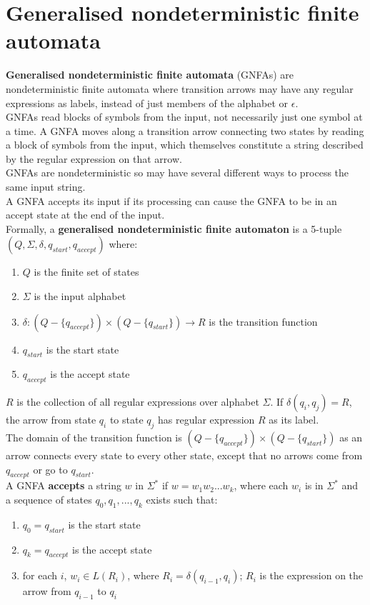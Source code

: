 \documentclass{article}
\begin{document}
\section{Generalised nondeterministic finite automata}
\textbf{Generalised nondeterministic finite automata} (GNFAs) are nondeterministic finite automata where transition arrows may have any regular expressions as labels, instead of just members of the alphabet or $\epsilon$.\medskip
\\ GNFAs read blocks of symbols from the input, not necessarily just one symbol at a time. A GNFA moves along a transition arrow connecting two states by reading a block of symbols from the input, which themselves constitute a string described by the regular expression on that arrow.\medskip
\\ GNFAs are nondeterministic so may have several different ways to process the same input string.\medskip
\\ A GNFA accepts its input if its processing can cause the GNFA to be in an accept state at the end of the input.\medskip
\\Formally, a \textbf{generalised nondeterministic finite automaton} is a 5-tuple $(Q, \Sigma, \delta, q_{start}, q_{accept})$ where:
\begin{enumerate}
	\item $Q$ is the finite set of states
	\item $\Sigma$ is the input alphabet
	\item $\delta: (Q - \{q_{accept}\}) \times (Q - \{q_{start}\}) \rightarrow R$ is the transition function
	\item $q_{start}$ is the start state
	\item $q_{accept}$ is the accept state
\end{enumerate}
$R$ is the collection of all regular expressions over alphabet $\Sigma$. If $\delta(q_i, q_j) = R$, the arrow from state $q_i$ to state $q_j$ has regular expression $R$ as its label.\medskip
\\ The domain of the transition function is $(Q - \{q_{accept}\}) \times (Q - \{q_{start}\})$ as an arrow connects every state to every other state, except that no arrows come from $q_{accept}$ or go to $q_{start}$.\medskip
\\A GNFA \textbf{accepts} a string $w$ in $\Sigma^*$ if $w = w_1w_2...w_k$, where each $w_i$ is in $\Sigma^*$ and a sequence of states $q_0, q_1, ..., q_k$ exists such that:
\begin{enumerate}
	\item $q_0 = q_{start}$ is the start state
	\item $q_k = q_{accept}$ is the accept state
	\item for each $i$, $w_i \in L(R_i)$, where $R_i = \delta(q_{i-1}, q_i)$; $R_i$ is the expression on the arrow from $q_{i-1}$ to $q_i$
\end{enumerate}
\end{document}
